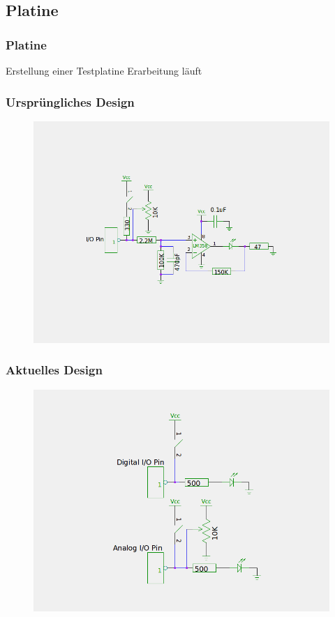 \documentclass{beamer}
\begin{document}
\begin{frame}
\section{Platine}
\frametitle{Platine}
  \begin{block}{Erstellung einer Testplatine}
  Erarbeitung läuft
  \end{block}
\end{frame}
\begin{frame}
  \frametitle{Ursprüngliches Design}
  \begin{figure}
    \centering
    \includegraphics[width=\textwidth,keepaspectratio]{./pics/Board1.png}
  \end{figure}
\end{frame}
\begin{frame}
  \frametitle{Aktuelles Design}
  \begin{figure}
    \centering
    \includegraphics[width=\textwidth,keepaspectratio]{./pics/Board2.png}
  \end{figure}
\end{frame}
\end{document}

